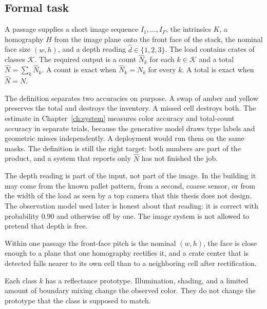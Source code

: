 \subsection{Formal task}
\label{sec:formal}

\begin{definition}
\label{def:task}
A passage supplies a short image sequence $I_{1},\ldots,I_{F}$, the intrinsics $K$, a homography $H$ from the image plane onto the front face of the stack, the nominal face size $(w,h)$, and a depth reading $\hat{d}\in\{1,2,3\}$. The load contains crates of classes $\mathcal{K}$. The required output is a count $\hat{N}_{k}$ for each $k\in\mathcal{K}$ and a total $\hat{N}=\sum_{k}\hat{N}_{k}$. A count is exact when $\hat{N}_{k}=N_{k}$ for every $k$. A total is exact when $\hat{N}=N$.
\end{definition}

The definition separates two accuracies on purpose. A swap of amber and yellow preserves the total and destroys the inventory. A missed cell destroys both. The estimate in Chapter~\ref{ch:system} measures color accuracy and total-count accuracy in separate trials, because the generative model draws type labels and geometric misses independently. A deployment would run them on the same masks. The definition is still the right target: both numbers are part of the product, and a system that reports only $\hat{N}$ has not finished the job.

The depth reading is part of the input, not part of the image. In the building it may come from the known pallet pattern, from a second, coarse sensor, or from the width of the load as seen by a top camera that this thesis does not design. The observation model used later is honest about that reading: it is correct with probability $0.90$ and otherwise off by one. The image system is not allowed to pretend that depth is free.

\begin{assumption}
\label{ass:lattice}
Within one passage the front-face pitch is the nominal $(w,h)$, the face is close enough to a plane that one homography rectifies it, and a crate center that is detected falls nearer to its own cell than to a neighboring cell after rectification.
\end{assumption}

\begin{assumption}
\label{ass:color}
Each class $k$ has a reflectance prototype. Illumination, shading, and a limited amount of boundary mixing change the observed color. They do not change the prototype that the class is supposed to match.
\end{assumption}


